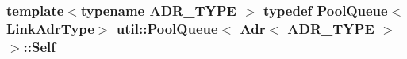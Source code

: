 \hypertarget{structutil_1_1PoolQueue_3_01Adr_3_01ADR__TYPE_01_4_01_4_a64eb6d023f5a3439af870e073f7f39cf}{
\subsubsection[{Self}]{\setlength{\rightskip}{0pt plus 5cm}template$<$typename A\-D\-R\-\_\-\-T\-Y\-P\-E $>$ typedef {\bf Pool\-Queue}$<${\bf Link\-Adr\-Type}$>$ {\bf util\-::\-Pool\-Queue}$<$ {\bf Adr}$<$ A\-D\-R\-\_\-\-T\-Y\-P\-E $>$ $>$\-::{\bf Self}}}\label{structutil_1_1PoolQueue_3_01Adr_3_01ADR__TYPE_01_4_01_4_a64eb6d023f5a3439af870e073f7f39cf}


